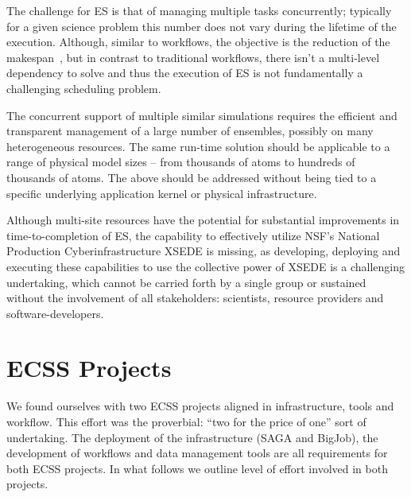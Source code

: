 \documentclass{sig-alternate}
\begin{document}


The challenge for ES is that of managing multiple tasks concurrently;
typically for a given science problem this number does not vary during
the lifetime of the execution. Although, similar to workflows, the
objective is the reduction of the makespan~, but in contrast to
traditional workflows, there isn't a multi-level dependency to solve
and thus the execution of ES is not fundamentally a challenging
scheduling problem.

The concurrent support of multiple similar simulations requires the
efficient and transparent management of a large number of ensembles,
possibly on many heterogeneous resources. The same run-time solution
should be applicable to a range of physical model sizes -- from
thousands of atoms to hundreds of thousands of atoms.%
The above should be addressed without being tied to a specific
underlying application kernel or physical infrastructure. 
 
Although multi-site resources have the potential for substantial
improvements in time-to-completion of ES, the capability to
effectively utilize NSF's National Production Cyberinfrastructure
XSEDE is missing, as developing, deploying and executing these
capabilities to use the collective power of XSEDE is a challenging
undertaking, which cannot be carried forth by a single group or
sustained without the involvement of all stakeholders: scientists,
resource providers and software-developers.

\section{ECSS Projects}

We found ourselves with two ECSS projects aligned in infrastructure, tools and
workflow. This effort was the proverbial: ``two for the price of one'' sort
of undertaking. The deployment of the infrastructure (SAGA and BigJob), the
development of workflows and data management tools are all requirements
for both ECSS projects. In what follows we outline level of effort involved
in both projects.
\end{document}
